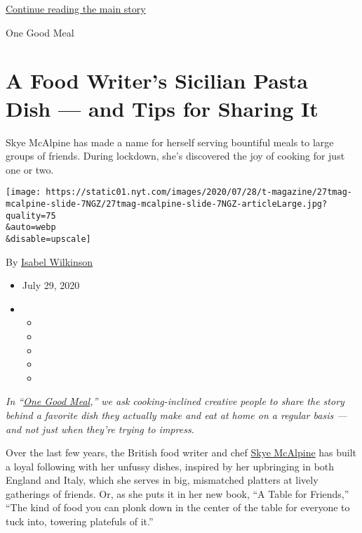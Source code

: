 \protect\hyperlink{after-sponsor}{Continue reading the main story}

One Good Meal

\hypertarget{a-food-writers-sicilian-pasta-dish--and-tips-for-sharing-it}{%
\section{A Food Writer's Sicilian Pasta Dish --- and Tips for Sharing
It}\label{a-food-writers-sicilian-pasta-dish--and-tips-for-sharing-it}}

Skye McAlpine has made a name for herself serving bountiful meals to
large groups of friends. During lockdown, she's discovered the joy of
cooking for just one or two.

\texttt{[image: https://static01.nyt.com/images/2020/07/28/t-magazine/27tmag-mcalpine-slide-7NGZ/27tmag-mcalpine-slide-7NGZ-articleLarge.jpg?quality=75\\\&auto=webp\\\&disable=upscale]}

By \href{https://www.nytimes.com/by/isabel-wilkinson}{Isabel Wilkinson}

\begin{itemize}
\item
  July 29, 2020
\item
  \begin{itemize}
  \item
  \item
  \item
  \item
  \item
  \end{itemize}
\end{itemize}

\emph{In
``}\href{https://www.nytimes.com/column/one-good-meal}{\emph{One Good
Meal}}\emph{,'' we ask cooking-inclined creative people to share the
story behind a favorite dish they actually make and eat at home on a
regular basis --- and not just when they're trying to impress.}

Over the last few years, the British food writer and chef
\href{https://www.nytimes.com/2018/07/02/dining/table-in-venice-book-skye-mcalpine.html}{Skye
McAlpine} has built a loyal following with her unfussy dishes, inspired
by her upbringing in both England and Italy, which she serves in big,
mismatched platters at lively gatherings of friends. Or, as she puts it
in her new book, ``A Table for Friends,'' ``The kind of food you can
plonk down in the center of the table for everyone to tuck into,
towering platefuls of it.''


